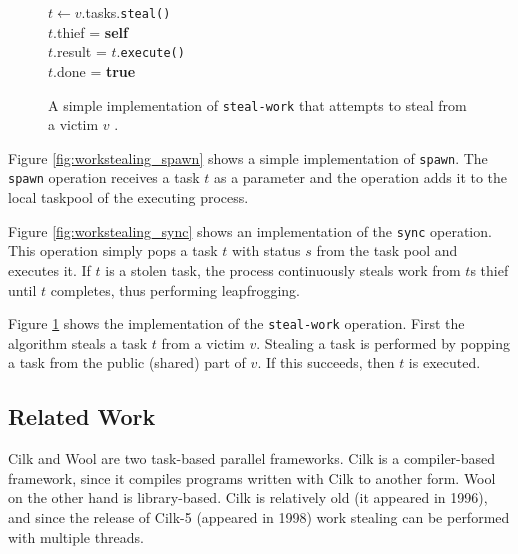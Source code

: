 \begin{figure}
	\centering
	\begin{algorithm}[H]
		\SetStartEndCondition{ }{}{}%
		\AlgoDontDisplayBlockMarkers\SetAlgoNoEnd\SetAlgoNoLine%

		 {
			$t \gets v$.tasks.\texttt{steal()} \\
			 {
				$t$.thief = \textbf{self} \\
				$t$.result = $t$.\texttt{execute()} \\
				$t$.done = \textbf{true}
			}
		}
	\end{algorithm}

	\caption{A simple implementation of \texttt{steal-work} that attempts to steal from a victim $v$ \cite{lace}.}
	\label{fig:workstealing_steal}
\end{figure}

Figure \ref{fig:workstealing_spawn} shows a simple implementation of \texttt{spawn}. The \texttt{spawn} operation receives a task $t$ as a parameter and the operation adds it to the local taskpool of the executing process. 

Figure \ref{fig:workstealing_sync} shows an implementation of the \texttt{sync} operation. This operation simply pops a task $t$ with status $s$ from the task pool and executes it. If $t$ is a stolen task, the process continuously steals work from $t$s thief until $t$ completes, thus performing leapfrogging. 

Figure \ref{fig:workstealing_steal} shows the implementation of the \texttt{steal-work} operation. First the algorithm steals a task $t$ from a victim $v$. Stealing a task is performed by popping a task from the public (shared) part of $v$. If this succeeds, then $t$ is executed.

\subsection{Related Work}
Cilk and Wool \cite{blumofe1996cilk, faxen2009wool} are two task-based parallel frameworks. Cilk is a compiler-based framework, since it compiles programs written with Cilk to another form. Wool on the other hand is library-based. Cilk is relatively old (it appeared in 1996), and since the release of Cilk-5 \cite{frigo1998implementation} (appeared in 1998) work stealing can be performed with multiple threads. 

